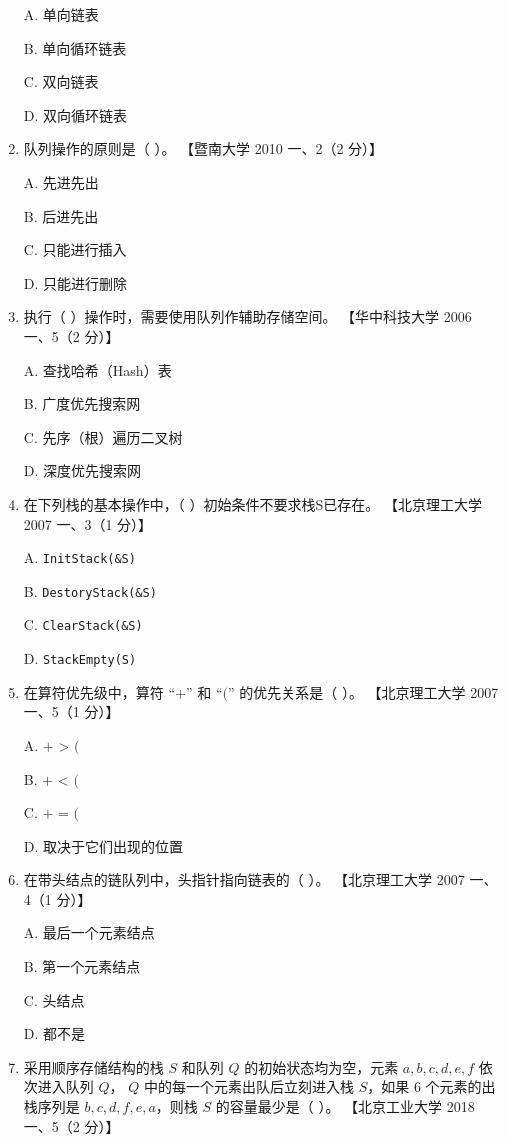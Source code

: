 \documentclass[lang=cn,newtx,10pt,scheme=chinese]{elegantbook}
\begin{document}
\begin{enumerate}
    A. 单向链表  

    B. 单向循环链表  

    C. 双向链表  

    D. 双向循环链表  

    \item 队列操作的原则是（ ）。  
    【暨南大学 2010 一、2（2 分）】  

    A. 先进先出  

    B. 后进先出  

    C. 只能进行插入  

    D. 只能进行删除  

    \item 执行（ ）操作时，需要使用队列作辅助存储空间。  
    【华中科技大学 2006 一、5（2 分）】  

    A. 查找哈希（Hash）表  

    B. 广度优先搜索网  

    C. 先序（根）遍历二叉树  

    D. 深度优先搜索网  

    \item 在下列栈的基本操作中，（ ）初始条件不要求栈S已存在。  
    【北京理工大学 2007 一、3（1 分）】  

    A. \texttt{InitStack(\&S)}  

    B. \texttt{DestoryStack(\&S)}  

    C. \texttt{ClearStack(\&S)}  

    D. \texttt{StackEmpty(S)}  

    \item 在算符优先级中，算符 “$+$” 和 “$($” 的优先关系是（ ）。  
    【北京理工大学 2007 一、5（1 分）】  

    A. $+$ > $($  

    B. $+$ < $($  

    C. $+$ = $($  

    D. 取决于它们出现的位置  

    \item 在带头结点的链队列中，头指针指向链表的（ ）。  
    【北京理工大学 2007 一、4（1 分）】  

    A. 最后一个元素结点  

    B. 第一个元素结点  

    C. 头结点  

    D. 都不是  

    \item 采用顺序存储结构的栈 $S$ 和队列 $Q$ 的初始状态均为空，元素 $a, b, c, d, e, f$ 依次进入队列 $Q$，
    $Q$ 中的每一个元素出队后立刻进入栈 $S$，如果 6 个元素的出栈序列是 $b,c,d,f,e,a$，则栈 $S$ 的容量最少是（ ）。  
    【北京工业大学 2018 一、5（2 分）】  


\end{enumerate}
\end{document}
